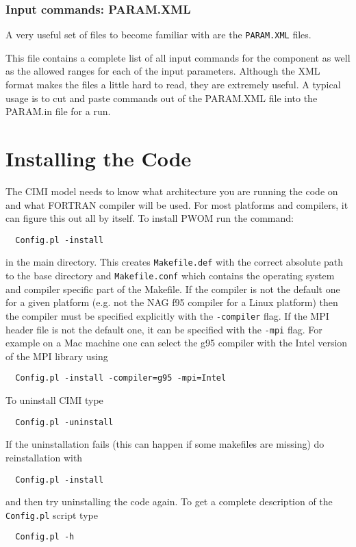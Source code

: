 \subsubsection{Input commands: PARAM.XML}
A very useful set of files to become familiar with are the {\tt PARAM.XML}
files.

This file contains a complete list of all input commands for the
component as well as the allowed ranges for each of the input parameters.
Although the XML format makes the files a little hard to read, they are
extremely useful.  A typical usage is to cut and paste commands out of the
PARAM.XML file into the PARAM.in file for a run.


\section{Installing the Code}


The CIMI model needs to know what architecture you are running the code on
and what FORTRAN compiler will be used.  For most platforms and compilers,
it can figure this out all by itself. To install PWOM run the command:
\begin{verbatim}
  Config.pl -install
\end{verbatim}
in the main directory. This creates {\tt Makefile.def} with
the correct absolute path to the base directory and {\tt Makefile.conf}
which contains the operating system and compiler specific part of
the Makefile. If the compiler is not the default one for a given
platform (e.g. not the NAG f95 compiler for a Linux platform) then
the compiler must be specified explicitly with the {\tt -compiler}
flag. If the MPI header file is not the default one, it can be
specified with the {\tt -mpi} flag. For example on a Mac machine
one can select the g95 compiler with the Intel version of the 
MPI library using
\begin{verbatim}
  Config.pl -install -compiler=g95 -mpi=Intel
\end{verbatim}
To uninstall CIMI type
\begin{verbatim}
  Config.pl -uninstall
\end{verbatim}
If the uninstallation fails (this can happen if some makefiles are missing)
do reinstallation with
\begin{verbatim}
  Config.pl -install
\end{verbatim}
and then try uninstalling the code again.
To get a complete description of the {\tt Config.pl}  script type
\begin{verbatim}
  Config.pl -h
\end{verbatim}


